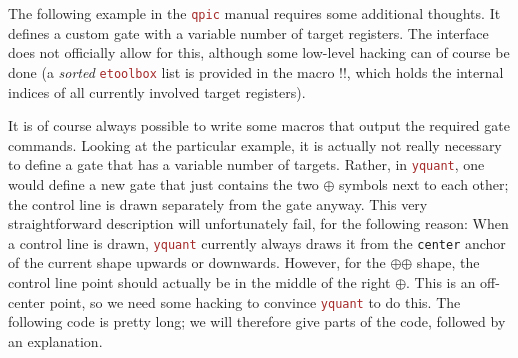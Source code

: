 \documentclass{scrartcl}
\def\pkg#1{\textcolor{brown}{\texttt{#1}}}
\def\texlink{\link\tex}
\def\Yquant{\pkg{yquant}}
\begin{document}
            \begin{example}
               The following example in the \pkg{qpic} manual requires some additional thoughts.
               It defines a custom gate with a variable number of target registers.
               The \texlink{\yquantdefinegate} interface does not officially allow for this, although some low\hyp level hacking can of course be done (a \emph{sorted} \pkg{etoolbox} list is provided in the macro \tex!\yquant@circuit@subcircuit@param!, which holds the internal indices of all currently involved target registers).

               It is of course always possible to write some macros that output the required gate commands.
               Looking at the particular example, it is actually not really necessary to define a gate that has a variable number of targets.
               Rather, in \Yquant, one would define a new gate that just contains the two $\oplus$ symbols next to each other; the control line is drawn separately from the gate anyway.
               This very straightforward description will unfortunately fail, for the following reason:
               When a control line is drawn, \Yquant{} currently always draws it from the \texttt{center} anchor of the current shape upwards or downwards.
               However, for the $\mathord\oplus\!\mathord\oplus$ shape, the control line point should actually be in the middle of the right $\oplus$.
               This is an off\hyp center point, so we need some hacking to convince \Yquant{} to do this.
               The following code is pretty long; we will therefore give parts of the code, followed by an explanation.


\end{example}
\end{document}
